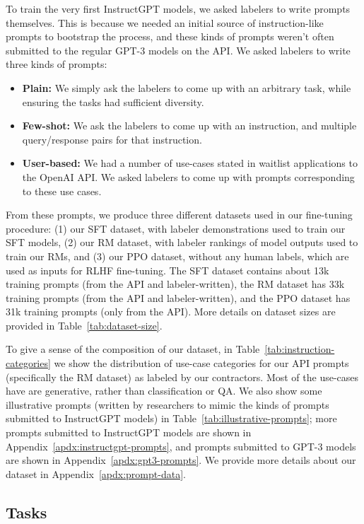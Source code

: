 \documentclass{article}
\begin{document}
To train the very first InstructGPT models, we asked labelers to write prompts themselves. This is because we needed an initial source of instruction-like prompts to bootstrap the process, and these kinds of prompts weren't often submitted to the regular GPT-3 models on the API. We asked labelers to write three kinds of prompts:
\begin{itemize}
    \item \textbf{Plain:}  We simply ask the labelers to come up with an arbitrary task, while ensuring the tasks had sufficient diversity.
\item \textbf{Few-shot:}  We ask the labelers to come up with an instruction, and multiple query/response pairs for that instruction.  
\item \textbf{User-based:}  We had a number of use-cases stated in waitlist applications to the OpenAI API.  We asked labelers to come up with prompts corresponding to these use cases. 
\end{itemize}



From these prompts, we produce three different datasets used in our fine-tuning procedure: (1) our SFT dataset, with labeler demonstrations used to train our SFT models, (2) our RM dataset, with labeler rankings of model outputs used to train our RMs, and (3) our PPO dataset, without any human labels, which are used as inputs for RLHF fine-tuning. The SFT dataset contains about 13k training prompts (from the API and labeler-written), the RM dataset has 33k training prompts (from the API and labeler-written), and the PPO dataset has 31k training prompts (only from the API). More details on dataset sizes are provided in Table~\ref{tab:dataset-size}. 

To give a sense of the composition of our dataset, in Table~\ref{tab:instruction-categories} we show the distribution of use-case categories for our API prompts (specifically the RM dataset) as labeled by our contractors. Most of the use-cases have are generative, rather than classification or QA. We also show some illustrative prompts (written by researchers to mimic the kinds of prompts submitted to InstructGPT models) in Table~\ref{tab:illustrative-prompts}; more prompts submitted to InstructGPT models are shown in Appendix~\ref{apdx:instructgpt-prompts}, and prompts submitted to GPT-3 models are shown in Appendix~\ref{apdx:gpt3-prompts}.
We provide more details about our dataset in Appendix~\ref{apdx:prompt-data}.


\subsection{Tasks}
\label{sec:task}
\end{document}
